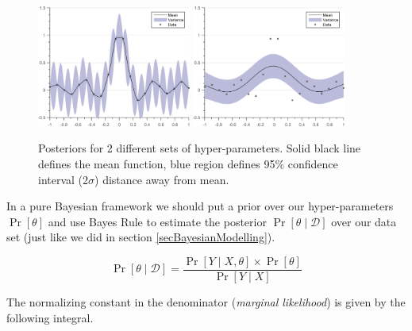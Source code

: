   \begin{figure}[!ht]
  \centering
    \subfigure[{Posterior between SE prior with hyper-parameters $(\theta = [0.35, 0.05]; \sigma_{noise} = 0.01)$ and data. }]
  {
        \includegraphics[width=0.45\textwidth]
        {images/part1/posteriorSE1}
        \label{subFigPosterior1}
  }\quad
\subfigure[{Posterior between SE prior with hyper-parameters $(\theta = [0.35, 0.5]; \sigma_{noise} = 0.01)$ and data. }]
  {
        \includegraphics[width=0.45\textwidth]
        {images/part1/posteriorSE3}
        \label{subFigPosterior3}
  }\quad
       \caption{Posteriors for 2 different sets of hyper-parameters. Solid black line defines the mean function, blue region defines 95\% confidence interval (2$\sigma$) distance away from mean. }\label{figGPRMarginal}
\end{figure}

In a pure Bayesian framework we should put a prior over our hyper-parameters $\Pr[\theta]$ and use Bayes Rule to estimate the posterior $\Pr[\theta \mid \mathcal{D}]$ over our data set (just like we did in section \ref{secBayesianModelling}). 

\begin{equation}
    \Pr[\theta \mid \mathcal{D}] = \frac{\Pr[Y \mid X, \theta] \times \Pr[\theta]}{\Pr[Y \mid X]}
\end{equation}

The normalizing constant in the denominator (\textit{marginal likelihood}) is given by the following integral.

